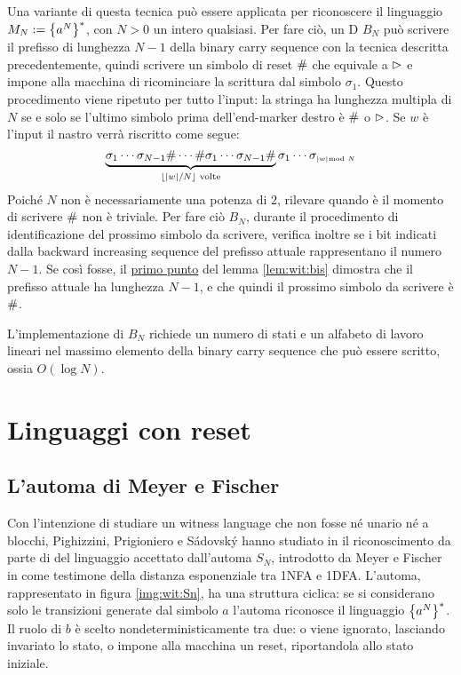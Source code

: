 Una variante di questa tecnica può essere applicata per riconoscere il linguaggio $M_N:=\left\{ a^N \right\}^*$, con $N>0$ un intero qualsiasi. Per fare ciò, un D $B_N$ può scrivere il prefisso di lunghezza $N-1$ della binary carry sequence con la tecnica descritta precedentemente, quindi scrivere un simbolo di reset $\#$ che equivale a $\rhd$ e impone alla macchina di ricominciare la scrittura dal simbolo $\sigma_1$. Questo procedimento viene ripetuto per tutto l'input: la stringa ha lunghezza multipla di $N$ se e solo se l'ultimo simbolo prima dell'end-marker destro è $\#$ o $\rhd$. Se $w$ è l'input il nastro verrà riscritto come segue:
\begin{equation*}
	\underbrace{\sigma_1\cdots\sigma_{N-1}\#\cdots\#\sigma_1\cdots\sigma_{N-1}\#}_{\lfloor |w|/N \rfloor \text{ volte}}\sigma_1\cdots\sigma_{\scriptscriptstyle |w|\mkern -11mu \mod N}
\end{equation*}
Poiché $N$ non è necessariamente una potenza di $2$, rilevare quando è il momento di scrivere $\#$ non è triviale. Per fare ciò $B_N$, durante il procedimento di identificazione del prossimo simbolo da scrivere, verifica inoltre se i bit indicati dalla backward increasing sequence del prefisso attuale rappresentano il numero $N-1$. Se così fosse, il \hyperref[lem:wit:bis:1]{primo punto} del lemma \ref{lem:wit:bis} dimostra che il prefisso attuale ha lunghezza $N-1$, e che quindi il prossimo simbolo da scrivere è $\#$.

L'implementazione di $B_N$ richiede un numero di stati e un alfabeto di lavoro lineari nel massimo elemento della binary carry sequence che può essere scritto, ossia $O(\log N)$.



\section{Linguaggi con reset}


\subsection{L'automa di Meyer e Fischer}
Con l'intenzione di studiare un witness language che non fosse né unario né a blocchi, Pighizzini, Prigioniero e Sádovský hanno studiato in \cite{Pighizzini:22:limitedwitness} il riconoscimento da parte di  del linguaggio accettato dall'automa $S_N$, introdotto da Meyer e Fischer in \cite{Meyer:71:ecodescription} come testimone della distanza esponenziale tra 1NFA e 1DFA. L'automa, rappresentato in figura \ref{img:wit:Sn}, ha una struttura ciclica: se si considerano solo le transizioni generate dal simbolo $a$ l'automa riconosce il linguaggio $\left\{ a^N \right\}^*$. Il ruolo di $b$ è scelto nondeterministicamente tra due: o viene ignorato, lasciando invariato lo stato, o impone alla macchina un reset, riportandola allo stato iniziale.

